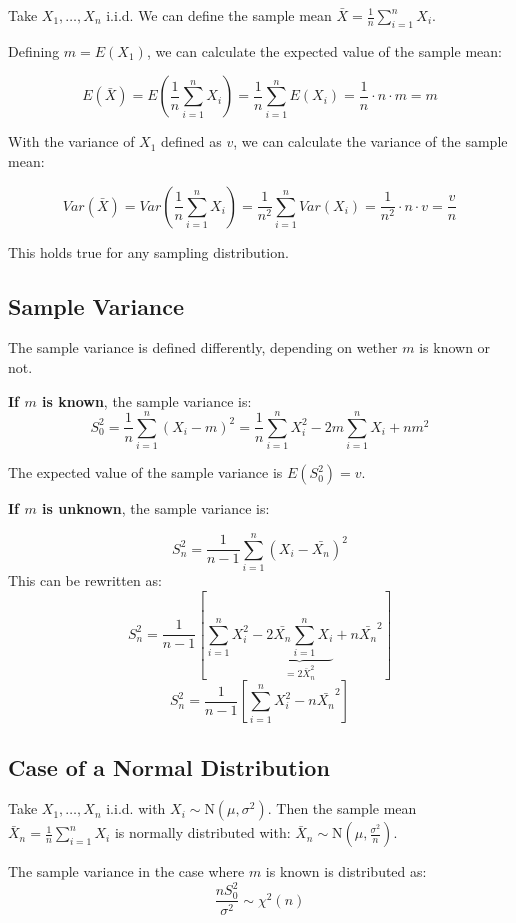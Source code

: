 Take $X_1, \ldots , X_n$ i.i.d. We can define the sample mean $\bar{X} = \frac{1}{n} \sum_{i=1}^{n} X_i$.

Defining $m = E(X_1)$, we can calculate the expected value of the sample mean:

\[
E(\bar{X}) = E\left(\frac{1}{n} \sum_{i=1}^{n} X_i\right) = \frac{1}{n} \sum_{i=1}^{n} E(X_i) = \frac{1}{n} \cdot n \cdot m = m
\]

With the variance of $X_1$ defined as $v$, we can calculate the variance of the sample mean:

\[
Var(\bar{X}) = Var\left(\frac{1}{n} \sum_{i=1}^{n} X_i\right) = \frac{1}{n^2} \sum_{i=1}^{n} Var(X_i) = \frac{1}{n^2} \cdot n \cdot v = \frac{v}{n}
\]

This holds true for any sampling distribution.

\subsection*{Sample Variance}

The sample variance is defined differently, depending on wether $m$ is known or not.

\textbf{If $m$ is known}, the sample variance is:
\[
S_0^2 = \frac{1}{n} \sum_{i=1}^{n} (X_i - m)^2 = \frac{1}{n} \sum_{i=1}^{n} X_i^2 - 2m \sum_{i=1}^{n} X_i + n m^2
\]

The expected value of the sample variance is $E(S_0^2) = v$.

\textbf{If $m$ is unknown}, the sample variance is:

\[
S_n^2 = \frac{1}{n-1} \sum_{i=1}^{n} (X_i - \bar{X_n})^2
\]
This can be rewritten as:
\[
S_n^2 = \frac{1}{n-1} \left[\sum_{i=1}^{n} X_i^2 - \underbrace{2\bar{X_n} \sum_{i=1}^{n} X_i}_{=2\bar{X}_n^2} + n \bar{X_n}^2\right]
\]
\[
S_n^2 = \frac{1}{n-1} \left[\sum_{i=1}^{n} X_i^2 - n \bar{X_n}^2\right]
\]

\subsection*{Case of a Normal Distribution}

Take $X_1, \ldots , X_n$ i.i.d. with $X_i \sim \text{N}(\mu, \sigma^2)$.
Then the sample mean $\bar{X}_n = \frac{1}{n} \sum_{i=1}^{n} X_i$ is normally distributed with:
$\bar{X}_n \sim \text{N}(\mu, \frac{\sigma^2}{n})$.

The sample variance in the case where $m$ is known is distributed as:
\[
\frac{n S_0^2}{\sigma^2} \sim \chi^2(n)
\]

